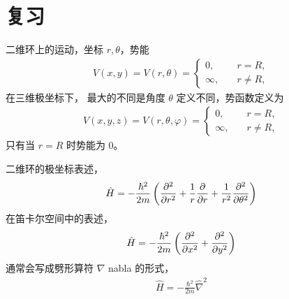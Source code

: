 

\section{复习}

二维环上的运动，坐标 $r,\theta$，势能
\begin{align}
    V(x,y) = V(r,\theta) = \begin{cases}
        0, \quad &r=R,\\
        \infty, \quad &r\neq R,
    \end{cases}
\end{align}
在三维极坐标下，
最大的不同是角度 $\theta$ 定义不同，势函数定义为
\begin{align}
    V(x,y,z) = V(r,\theta,\varphi) = \begin{cases}
        0,\quad &r=R,\\
        \infty, \quad &r\neq R,
    \end{cases}
\end{align}
只有当 $r=R$ 时势能为 0。


二维环的极坐标表述，
\begin{align}
    \hat H = - \frac{\hbar^2}{2m} \left(
        \pdv[2]{r} + \frac1r \pdv{r} + \frac1{r^2} \pdv[2]{\theta}
    \right)
\end{align}
在笛卡尔空间中的表述，
\begin{align}
    \hat H = -\frac{\hbar^2}{2m} \left(
        \pdv[2]{x} + \pdv[2]{y}
    \right)
\end{align}
通常会写成劈形算符 $\nabla$ nabla 的形式，
\begin{align}
    \hat H = -\frac{\hbar^2}{2m} \hat \nabla^2
\end{align}

